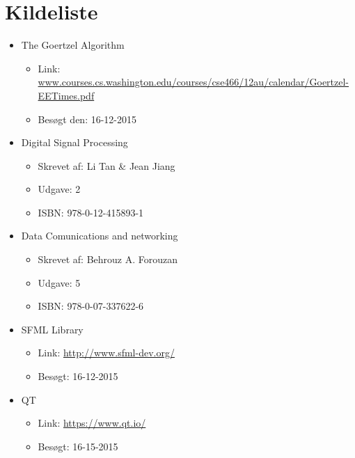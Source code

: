 \section{Kildeliste}

\begin{itemize}[noitemsep]
  \item The Goertzel Algorithm
  \begin{itemize}[noitemsep]
    \item Link: \url{www.courses.cs.washington.edu/courses/cse466/12au/calendar/Goertzel-EETimes.pdf}
    \item Besøgt den: 16-12-2015
  \end{itemize}
  
  \item Digital Signal Processing
  \begin{itemize}[noitemsep]
  	\item Skrevet af: Li Tan \& Jean Jiang
  	\item Udgave: 2
  	\item ISBN: 978-0-12-415893-1
  \end{itemize}
  
   \item Data Comunications and networking
	\begin{itemize} [noitemsep]
	\item Skrevet af: Behrouz A. Forouzan
  	\item Udgave: 5
  	\item ISBN: 978-0-07-337622-6
\end{itemize}
  
  \item SFML Library
  \begin{itemize}[noitemsep]
    \item Link: \url{http://www.sfml-dev.org/}
    \item Besøgt: 16-12-2015
  \end{itemize}
  
  \item QT
	\begin{itemize} [noitemsep]
	\item Link: \url{https://www.qt.io/}
	\item Besøgt: 16-15-2015
\end{itemize}


 
\end{itemize}


